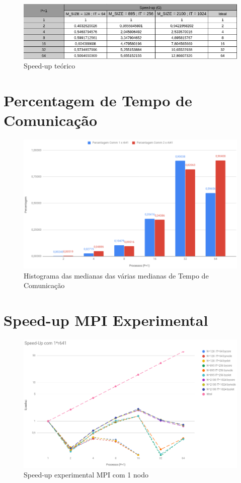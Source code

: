 \documentclass{article}
\begin{document}
\begin{appendices}
\begin{figure}[H]
    \centering
    \includegraphics[width=15cm]{Pictures/TheoreticalTbl.png}
    \caption{Speed-up teórico}
\end{figure}

\section{Percentagem de Tempo de Comunicação}
\begin{figure}[H]
    \centering
    \includegraphics[width=18cm]{Pictures/histogramaPerc.png}
    \caption{Histograma das medianas das várias medianas de Tempo de Comunicação}
    \label{comm_time_perc}
\end{figure}

\section{Speed-up MPI Experimental}
\label{mpi_speedup_graph}
\begin{figure}[H]
    \centering
    \includegraphics[width=16cm]{Pictures/ExperimentalGraph1.png}
    \caption{Speed-up experimental MPI com 1 nodo}
\end{figure}


\end{appendices}
\end{document}
